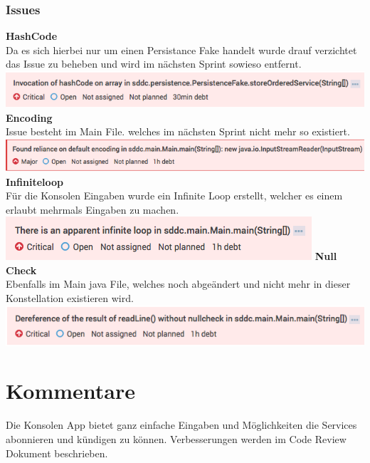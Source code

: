 \subsubsection{Issues}
\textbf{HashCode}\\
Da es sich hierbei nur um einen Persistance Fake handelt wurde drauf verzichtet 
das Issue zu beheben und wird im nächsten Sprint sowieso entfernt.
\newline
\includegraphics[width=\textwidth]{./10_Protokolle/04_Testprotokoll/images/Sprint1/hashcode}
\newline
\textbf{Encoding}\\
Issue besteht im Main File. welches im nächsten Sprint nicht mehr so existiert.
\newline
\includegraphics[width=\textwidth]{./10_Protokolle/04_Testprotokoll/images/Sprint1/encoding}
\newline
\textbf{Infiniteloop}\\
Für die Konsolen Eingaben wurde ein Infinite Loop erstellt, welcher es einem 
erlaubt mehrmals Eingaben zu machen.
\newline
\includegraphics[width=\textwidth]{./10_Protokolle/04_Testprotokoll/images/Sprint1/infiniteloop}
\newline
\textbf{Null Check}\\
Ebenfalls im Main java File, welches noch abgeändert und nicht mehr in dieser 
Konstellation existieren wird.
\newline
\includegraphics[width=\textwidth]{./10_Protokolle/04_Testprotokoll/images/Sprint1/nullcheck}

\section{Kommentare}

Die Konsolen App bietet ganz einfache Eingaben und Möglichkeiten die Services 
abonnieren und kündigen zu können.
Verbesserungen werden im Code Review Dokument beschrieben.
